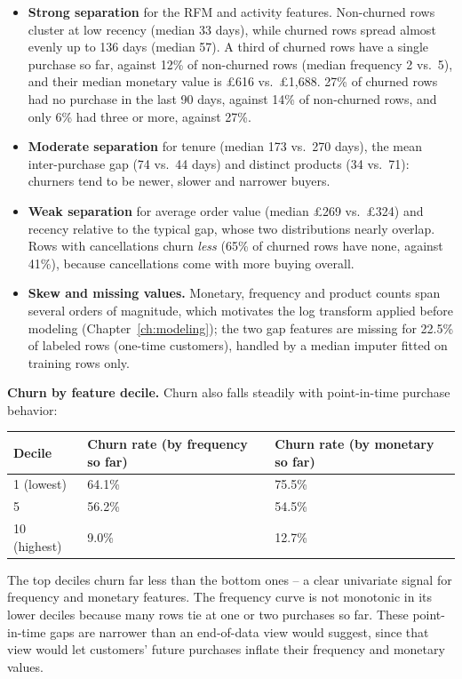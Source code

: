 \begin{itemize}
    \item \textbf{Strong separation} for the RFM and activity features. Non-churned rows cluster at low recency (median 33 days), while churned rows spread almost evenly up to 136 days (median 57). A third of churned rows have a single purchase so far, against 12\% of non-churned rows (median frequency 2 vs.\ 5), and their median monetary value is \pounds616 vs.\ \pounds1,688. 27\% of churned rows had no purchase in the last 90 days, against 14\% of non-churned rows, and only 6\% had three or more, against 27\%.
    \item \textbf{Moderate separation} for tenure (median 173 vs.\ 270 days), the mean inter-purchase gap (74 vs.\ 44 days) and distinct products (34 vs.\ 71): churners tend to be newer, slower and narrower buyers.
    \item \textbf{Weak separation} for average order value (median \pounds269 vs.\ \pounds324) and recency relative to the typical gap, whose two distributions nearly overlap. Rows with cancellations churn \emph{less} (65\% of churned rows have none, against 41\%), because cancellations come with more buying overall.
    \item \textbf{Skew and missing values.} Monetary, frequency and product counts span several orders of magnitude, which motivates the log transform applied before modeling (Chapter~\ref{ch:modeling}); the two gap features are missing for 22.5\% of labeled rows (one-time customers), handled by a median imputer fitted on training rows only.
\end{itemize}

\textbf{Churn by feature decile.} Churn also falls steadily with point-in-time purchase behavior:

\begin{center}
\begin{tabular}{@{}p{3cm}p{4.2cm}p{4.2cm}@{}}
    \toprule
    Decile & Churn rate (by frequency so far) & Churn rate (by monetary so far) \\
    \midrule
    1 (lowest) & 64.1\% & 75.5\% \\
    5 & 56.2\% & 54.5\% \\
    10 (highest) & 9.0\% & 12.7\% \\
    \bottomrule
\end{tabular}
\end{center}

The top deciles churn far less than the bottom ones -- a clear univariate signal for frequency and monetary features. The frequency curve is not monotonic in its lower deciles because many rows tie at one or two purchases so far. These point-in-time gaps are narrower than an end-of-data view would suggest, since that view would let customers' future purchases inflate their frequency and monetary values.

